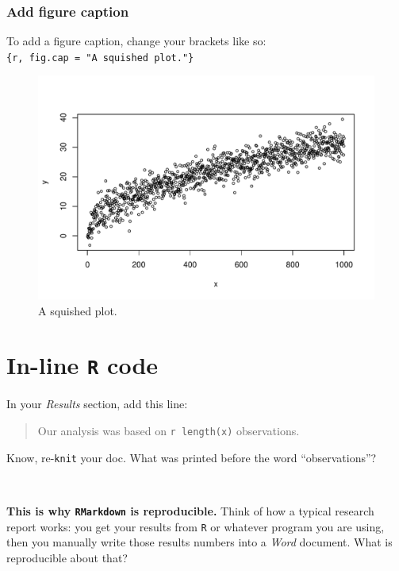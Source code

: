\documentclass[
]{book}
\begin{document}
\hypertarget{add-figure-caption}{%
\subsubsection*{Add figure caption}\label{add-figure-caption}}

To add a figure caption, change your brackets like so: \texttt{\{r,\ fig.cap\ =\ "A\ squished\ plot."\}}

\begin{figure}
\includegraphics[width=504px]{figures/unnamed-chunk-214-1} \caption{A squished plot.}\label{fig:unnamed-chunk-214}
\end{figure}

\hypertarget{in-line-r-code}{%
\section*{\texorpdfstring{In-line \texttt{R} code}{In-line R code}}\label{in-line-r-code}}

In your \emph{Results} section, add this line:

\begin{quote}
Our analysis was based on \texttt{\textasciigrave{}r\ length(x)\textasciigrave{}} observations.
\end{quote}

Know, re-\texttt{knit} your doc. What was printed before the word ``observations''?

~

\textbf{This is why \texttt{RMarkdown} is reproducible.} Think of how a typical research report works: you get your results from
\texttt{R} or whatever program you are using, then you manually write those results numbers into a \emph{Word} document. What is reproducible about that?
\end{document}
